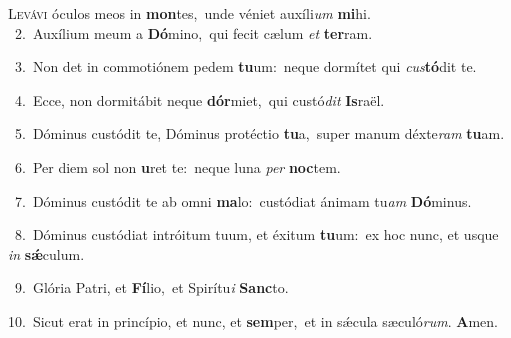 \lettrine{\initial\textcolor{\initialcolor}{L}}{evávi} óculos meos in \textbf{mon}\-tes,~\star unde véniet auxíli\textit{um} \textbf{mi}\-hi.\\
{\numbfont\textcolor{\numbcolor}{~2.}}~Auxílium meum a \textbf{Dó}\-mino,~\star qui fecit cælum \textit{et} \textbf{ter}\-ram.\par
{\numbfont\textcolor{\numbcolor}{~3.}}~Non det in commotiónem pedem \textbf{tu}\-um:~\star neque dormítet qui \textit{cus}\-\textbf{tó}dit te.\par
{\numbfont\textcolor{\numbcolor}{~4.}}~Ecce, non dormitábit neque \textbf{dór}\-miet,~\star qui custó\textit{dit} \textbf{Is}\-raël.\par
{\numbfont\textcolor{\numbcolor}{~5.}}~Dóminus custódit te, Dóminus protéctio \textbf{tu}\-a,~\star super manum déxte\textit{ram} \textbf{tu}\-am.\par
{\numbfont\textcolor{\numbcolor}{~6.}}~Per diem sol non \textbf{u}\-ret te:~\star neque luna \textit{per} \textbf{noc}\-tem.\par
{\numbfont\textcolor{\numbcolor}{~7.}}~Dóminus custódit te ab omni \textbf{ma}\-lo:~\star custódiat ánimam tu\textit{am} \textbf{Dó}\-minus.\par
{\numbfont\textcolor{\numbcolor}{~8.}}~Dóminus custódiat intróitum tuum, et éxitum \textbf{tu}\-um:~\star ex hoc nunc, et usque \textit{in} \textbf{sǽ}\-culum.\par
{\numbfont\textcolor{\numbcolor}{~9.}}~Glória Patri, et \textbf{Fí}\-lio,~\star et Spirítu\textit{i} \textbf{Sanc}\-to.\par
{\numbfont\textcolor{\numbcolor}{10.}}~Sicut erat in princípio, et nunc, et \textbf{sem}\-per,~\star et in sǽcula sæculó\-\textit{rum}\-. \textbf{A}\-men.\par

